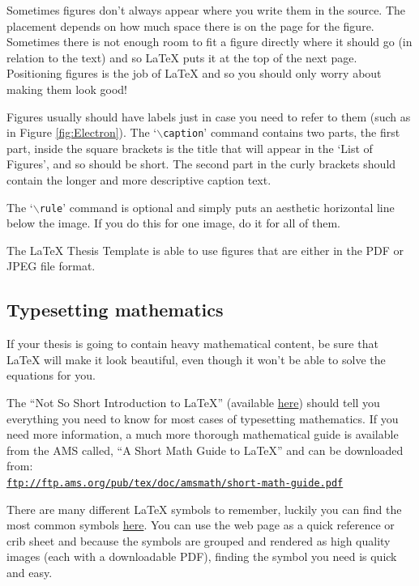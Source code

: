 Sometimes figures don't always appear where you write them in the source. The placement depends on how much space there is on the page for the figure. Sometimes there is not enough room to fit a figure directly where it should go (in relation to the text) and so \LaTeX{} puts it at the top of the next page. Positioning figures is the job of \LaTeX{} and so you should only worry about making them look good!

Figures usually should have labels just in case you need to refer to them (such as in Figure \ref{fig:Electron}). The `$\backslash$\texttt{caption}' command contains two parts, the first part, inside the square brackets is the title that will appear in the `List of Figures', and so should be short. The second part in the curly brackets should contain the longer and more descriptive caption text.

The `$\backslash$\texttt{rule}' command is optional and simply puts an aesthetic horizontal line below the image. If you do this for one image, do it for all of them.

The \LaTeX{} Thesis Template is able to use figures that are either in the PDF or JPEG file format.

\subsection{Typesetting mathematics}

If your thesis is going to contain heavy mathematical content, be sure that \LaTeX{} will make it look beautiful, even though it won't be able to solve the equations for you.

The ``Not So Short Introduction to \LaTeX{}'' (available \href{http://www.ctan.org/tex-archive/info/lshort/english/lshort.pdf}{here}) should tell you everything you need to know for most cases of typesetting mathematics. If you need more information, a much more thorough mathematical guide is available from the AMS called, ``A Short Math Guide to \LaTeX{}'' and can be downloaded from:\\
\href{ftp://ftp.ams.org/pub/tex/doc/amsmath/short-math-guide.pdf}{\texttt{ftp://ftp.ams.org/pub/tex/doc/amsmath/short-math-guide.pdf}}

There are many different \LaTeX{} symbols to remember, luckily you can find the most common symbols \href{http://www.sunilpatel.co.uk/latexsymbols.html}{here}. You can use the web page as a quick reference or crib sheet and because the symbols are grouped and rendered as high quality images (each with a downloadable PDF), finding the symbol you need is quick and easy.

